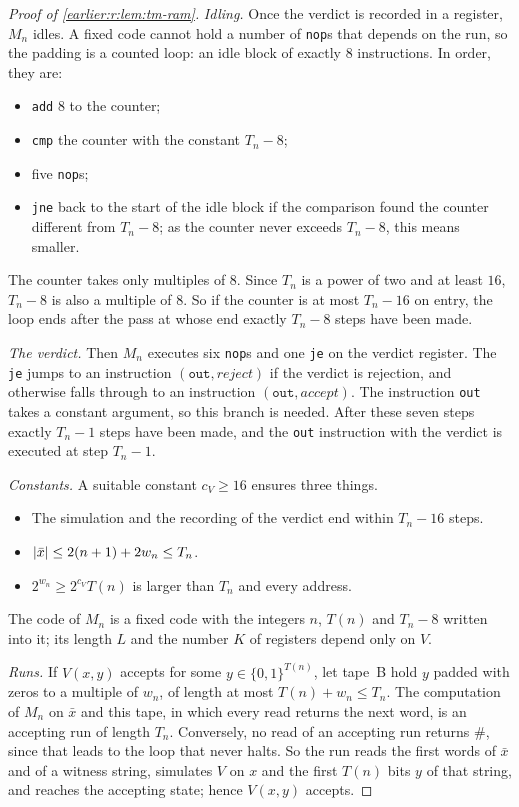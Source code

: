 \begin{proof}[Proof of \cref{earlier:r:lem:tm-ram}]
\emph{Idling.} Once the verdict is recorded in a register, \(M_n\)
idles. A fixed code cannot hold a number of \texttt{nop}s that depends
on the run, so the padding is a counted loop: an idle block of exactly
\(8\) instructions. In order, they are:
\begin{itemize}
\item \texttt{add} \(8\) to the counter;
\item \texttt{cmp} the counter with the constant \(T_n-8\);
\item five \texttt{nop}s;
\item \texttt{jne} back to the start of the idle block if the comparison
found the counter different from \(T_n-8\); as the counter never exceeds
\(T_n-8\), this means smaller.
\end{itemize}
The counter takes only multiples of \(8\). Since \(T_n\) is a power of
two and at least \(16\), \(T_n-8\) is also a multiple of \(8\). So if the
counter is at most \(T_n-16\) on entry, the loop ends after the pass at
whose end exactly \(T_n-8\) steps have been made.

\emph{The verdict.} Then \(M_n\) executes six \texttt{nop}s and one
\texttt{je} on the verdict register. The \texttt{je} jumps to an
instruction \((\texttt{out},\textit{reject})\) if the verdict is
rejection, and otherwise falls through to an instruction
\((\texttt{out},\textit{accept})\). The instruction \texttt{out} takes a
constant argument, so this branch is needed. After these seven steps
exactly \(T_n-1\) steps have been made, and the \texttt{out} instruction
with the verdict is executed at step \(T_n-1\).

\emph{Constants.} A suitable constant \(c_V\ge16\) ensures three things.
\begin{itemize}
\item The simulation and the recording of the verdict end within
\(T_n-16\) steps.
\item \(\left|\bar x\right|\le2(n+1)+2w_n\le T_n\).
\item \(2^{w_n}\ge2^{c_V}T(n)\) is larger than \(T_n\) and every
address.
\end{itemize}
The code of \(M_n\) is a fixed code with the integers \(n\), \(T(n)\)
and \(T_n-8\) written into it; its length \(L\) and the number \(K\) of
registers depend only on \(V\).

\emph{Runs.} If \(V(x,y)\) accepts for some \(y\in\{0,1\}^{T(n)}\), let
tape~B hold \(y\) padded with zeros to a multiple of \(w_n\), of length
at most \(T(n)+w_n\le T_n\). The computation of \(M_n\) on \(\bar x\) and
this tape, in which every read returns the next word, is an accepting
run of length \(T_n\). Conversely, no read of an accepting run returns
\(\#\), since that leads to the loop that never halts. So the run reads
the first words of \(\bar x\) and of a witness string, simulates \(V\) on
\(x\) and the first \(T(n)\) bits \(y\) of that string, and reaches the
accepting state; hence \(V(x,y)\) accepts.
\end{proof}


